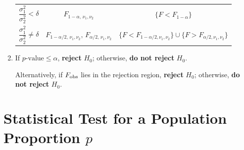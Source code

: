 \documentclass[twoside]{book}
\begin{document}
\begin{enumerate}
\begin{table}[H]
\begin{tabular}{@{}c|c|c@{}}
			\(\dfrac{\sigma_1^2}{\sigma_2^2} < \delta\) &
			\(F_{1-\alpha,\,\nu_1,\nu_2}\) &
			\(\{F < F_{1-\alpha}\}\) \\[6pt]

			\(\dfrac{\sigma_1^2}{\sigma_2^2} \neq \delta\) &
			\(F_{1-\alpha/2,\,\nu_1,\nu_2},\, F_{\alpha/2,\,\nu_1,\nu_2}\) &
			\(\{F < F_{1-\alpha/2,\nu_1,\nu_2}\} \cup \{F > F_{\alpha/2,\nu_1,\nu_2}\}\)
			\\
			\bottomrule
		\end{tabular}
	\end{table}

	\item If \(p\text{-value} \le \alpha\), \textbf{reject} \(H_0\); otherwise, \textbf{do not reject} \(H_0\).

	Alternatively, if \(F_{\rm obs}\) lies in the rejection region, \textbf{reject} \(H_0\); otherwise, \textbf{do not reject} \(H_0\).
\end{enumerate}



\section{Statistical Test for a Population Proportion \(p\)}
\end{document}
